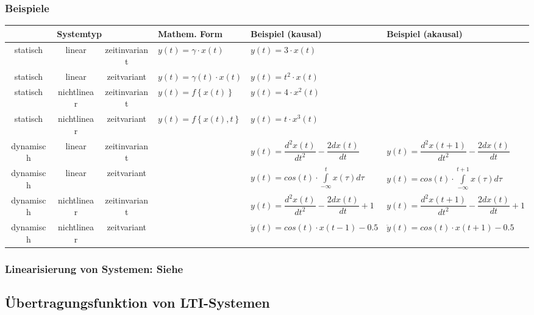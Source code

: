 		
		
		\subsubsection{Beispiele }

			\bgroup
			\setlength{\tabcolsep}{1.3mm}
			\begin{tabularx}{\textwidth}{|c|c|c|l|l|X|}
			\hline
				\multicolumn{3}{|c|}{\textbf{Systemtyp}}
			&	\textbf{Mathem. Form}
			&	\textbf{Beispiel (kausal)}
			&	\textbf{Beispiel (akausal)}
			\\ \hline
				statisch
			&	linear
			&	zeitinvariant
			&	$y(t) = \gamma \cdot x(t)$
			&	$y(t) = 3 \cdot x(t)$
			&	
			\\ \hline
				statisch
			&	linear
			&	zeitvariant
			&	$y(t) = \gamma(t) \cdot x(t)$
			&	$y(t) = t^2 \cdot x(t)$
			&	
			\\ \hline
				statisch
			&	nichtlinear
			&	zeitinvariant
			&	$y(t) = f \left\lbrace  x(t) \right\rbrace $
			&	$y(t) = 4 \cdot x^2(t)$
			&	
			\\ \hline
				statisch
			&	nichtlinear
			&	zeitvariant
			&	$y(t) = f \left\lbrace  x(t),t \right\rbrace $
			&	$y(t) = t \cdot x^3(t)$
			&	
			\\ \hline
				dynamisch
			&	linear
			&	zeitinvariant
			&	
			&	$y(t) = \dfrac{d^2 x(t)}{d t^2} - \dfrac{2 dx(t)}{dt}$
			&	$y(t) = \dfrac{d^2 x(t+1)}{d t^2} - \dfrac{2 dx(t)}{dt}$
			\\ \hline
				dynamisch
			&	linear
			&	zeitvariant
			&	
			&	$y(t) = cos(t) \cdot \int\limits_{-\infty}^{t} x(\tau) d\tau $
			&	$y(t) = cos(t) \cdot \int\limits_{-\infty}^{t+1} x(\tau) d\tau $
			\\ \hline
				dynamisch
			&	nichtlinear
			&	zeitinvariant
			&	
			&	$y(t) = \dfrac{d^2 x(t)}{d t^2} - \dfrac{2 dx(t)}{dt} + 1$
			&	$y(t) = \dfrac{d^2 x(t+1)}{d t^2} - \dfrac{2 dx(t)}{dt} + 1$
			\\ \hline
				dynamisch
			&	nichtlinear
			&	zeitvariant
			&	
			&	$ \ddot y(t) = cos(t) \cdot x(t-1) - 0.5$
			&	$ \ddot y(t) = cos(t) \cdot x(t+1) - 0.5$
			\\ \hline
			\end{tabularx}
			\egroup
			
			
	\subsubsection{Linearisierung von Systemen: Siehe }

	\subsection{Übertragungsfunktion von LTI-Systemen }
	
